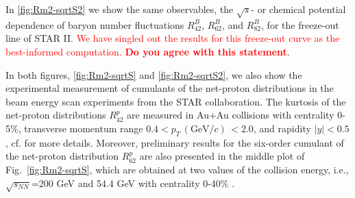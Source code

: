 \documentclass[%
reprint,
superscriptaddress,
showpacs,preprintnumbers,
amsmath,amssymb,
aps,
prd,
]{revtex4-1}
\def\Fig#1{Fig.~\ref{#1}} \def\Tab#1{Tab.~\ref{#1}}
\newcommand{\coljan}[1]{\textcolor{red}{#1}}
\begin{document}
In \autoref{fig:Rm2-sqrtS2} we show the same observables, the $\sqrt{s}$- or chemical potential  dependence of baryon number fluctuations $R^{B}_{42}$, $R^{B}_{62}$, and $R^{B}_{82}$, for the freeze-out line of STAR II. \coljan{We have singled out the results for this freeze-out curve as the best-informed computation.} \coljan{\bf Do you agree with this statement}. 

In both figures, \autoref{fig:Rm2-sqrtS} and \autoref{fig:Rm2-sqrtS2}, we also show the experimental measurement of cumulants of the net-proton distributions in the beam energy scan experiments from the STAR collaboration. The kurtosis of the net-proton distributions $R^{p}_{42}$ are measured in Au+Au collisions with centrality 0-5\%, transverse momentum range $0.4< p_T\,(\mathrm{GeV}/c)\,<2.0$, and rapidity $|y|<0.5$, cf. \cite{Adam:2020unf} for more details. Moreover, preliminary results for the six-order cumulant of the net-proton distribution $R^{p}_{62}$ are also presented in the middle plot of \Fig{fig:Rm2-sqrtS}, which are obtained at two values of the collision energy, i.e., $\sqrt{s_{NN}}$=200 GeV and 54.4 GeV with centrality 0-40\% \cite{Nonaka:2020crv,Pandav:2020uzx}. 
\end{document}
